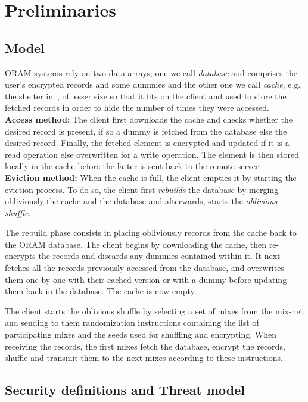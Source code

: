 \documentclass[USenglish,oneside,twocolumn]{article}
\begin{document}
\section{Preliminaries}\label{Prelim}
%
\subsection{Model}\label{Model}

ORAM systems rely on two data arrays, one we call \emph{database} and comprises the user's encrypted records and some dummies and the other one we call \emph{cache}, e.g. the shelter in~\cite{goldreich87}, of lesser size so that it fits on the client and used to store the fetched records in order to hide the number of times they were accessed.\\

\noindent\textbf{Access method:} The client first downloads the cache and checks whether the desired record is present, if so a dummy is fetched from the database else the desired record. Finally, the fetched element is encrypted and updated if it is a read operation else overwritten for a write operation. The element is then stored locally in the cache before the latter is sent back to the remote server.\\

\noindent\textbf{Eviction method:} When the cache is full, the client empties it by starting the eviction process. To do so, the client first \textit{rebuilds} the database by merging obliviously the cache and the database and afterwards, starts the \textit{oblivious shuffle}.

\noindent The rebuild phase consists in placing obliviously records from the cache back to the ORAM database. The client begins by downloading the cache, then re-encrypts the records and discards any dummies contained within it. It next fetches all the records previously accessed from the database, and overwrites them one by one with their cached version or with a dummy before updating them back in the database. The cache is now empty.

\noindent The client starts the oblivious shuffle by selecting a set of mixes from the mix-net and sending to them randomization instructions containing the list of participating mixes and the seeds used for shuffling and encrypting. When receiving the records, the first mixes fetch the database, encrypt the records, shuffle and transmit them to the next mixes according to these instructions.

\subsection{Security definitions and Threat model}\label{Threat}
\end{document}
